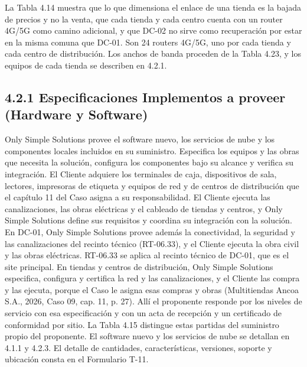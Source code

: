 \documentclass[11pt]{article}
\begin{document}
La Tabla 4.14 muestra que lo que dimensiona el enlace de una tienda es la bajada de precios y no la venta, que cada tienda y cada centro cuenta con un router 4G/5G como camino adicional, y que DC-02 no sirve como recuperación por estar en la misma comuna que DC-01. Son 24 routers 4G/5G, uno por cada tienda y cada centro de distribución. Los anchos de banda proceden de la Tabla 4.23, y los equipos de cada tienda se describen en 4.2.1.

\subsection{4.2.1 Especificaciones Implementos a proveer (Hardware y Software)}

Only Simple Solutions provee el software nuevo, los servicios de nube y los componentes locales incluidos en su suministro. Especifica los equipos y las obras que necesita la solución, configura los componentes bajo su alcance y verifica su integración. El Cliente adquiere los terminales de caja, dispositivos de sala, lectores, impresoras de etiqueta y equipos de red y de centros de distribución que el capítulo 11 del Caso asigna a su responsabilidad. El Cliente ejecuta las canalizaciones, las obras eléctricas y el cableado de tiendas y centros, y Only Simple Solutions define sus requisitos y coordina su integración con la solución. En DC-01, Only Simple Solutions provee además la conectividad, la seguridad y las canalizaciones del recinto técnico (RT-06.33), y el Cliente ejecuta la obra civil y las obras eléctricas. RT-06.33 se aplica al recinto técnico de DC-01, que es el site principal. En tiendas y centros de distribución, Only Simple Solutions especifica, configura y certifica la red y las canalizaciones, y el Cliente las compra y las ejecuta, porque el Caso le asigna esas compras y obras (Multitiendas Ancoa S.A., 2026, Caso 09, cap. 11, p. 27). Allí el proponente responde por los niveles de servicio con esa especificación y con un acta de recepción y un certificado de conformidad por sitio. La Tabla 4.15 distingue estas partidas del suministro propio del proponente. El software nuevo y los servicios de nube se detallan en 4.1.1 y 4.2.3. El detalle de cantidades, características, versiones, soporte y ubicación consta en el Formulario T-11.
\end{document}
